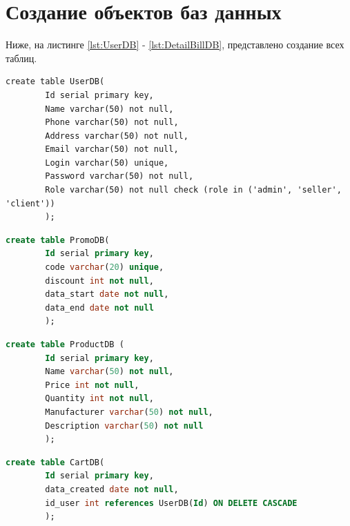 \section{Создание объектов баз данных}
Ниже, на листинге \ref{lst:UserDB} - \ref{lst:DetailBillDB}, представлено создание всех таблиц.

\begin{center}
	\captionsetup{justification=raggedright,singlelinecheck=off}
	\begin{lstlisting}[label=lst:UserDB,caption=Создание таблицы UserDB]
		create table UserDB(
		Id serial primary key,
		Name varchar(50) not null,
		Phone varchar(50) not null,
		Address varchar(50) not null,
		Email varchar(50) not null,
		Login varchar(50) unique,
		Password varchar(50) not null,
		Role varchar(50) not null check (role in ('admin', 'seller', 'client'))
		);
	\end{lstlisting}
\end{center}

\begin{center}
	\captionsetup{justification=raggedright,singlelinecheck=off}
	\begin{lstlisting}[label=lst:CategoryDB, language=sql,caption=Создание таблицы PromoDB]
		create table PromoDB(
		Id serial primary key,
		code varchar(20) unique,
		discount int not null,
		data_start date not null,
		data_end date not null
		);
	\end{lstlisting}
\end{center}

\clearpage
\begin{center}
	\captionsetup{justification=raggedright,singlelinecheck=off}
	\begin{lstlisting}[label=lst:PublisherDB, language=sql,caption=Создание таблицы ProductDB]
		create table ProductDB (
		Id serial primary key,
		Name varchar(50) not null,
		Price int not null,
		Quantity int not null,
		Manufacturer varchar(50) not null,
		Description varchar(50) not null
		);
	\end{lstlisting}
\end{center}

\begin{center}
	\captionsetup{justification=raggedright,singlelinecheck=off}
	\begin{lstlisting}[label=lst:AuthorDB, language=sql,caption=Создание таблицы CartDB]
		create table CartDB(
		Id serial primary key,
		data_created date not null,
		id_user int references UserDB(Id) ON DELETE CASCADE
		);
	\end{lstlisting}
\end{center}

